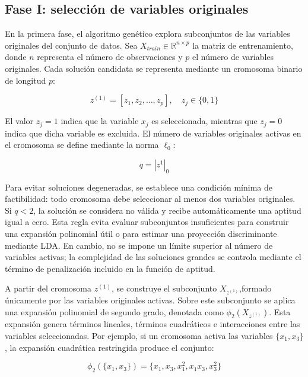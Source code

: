 \subsection{Fase I: selección de variables originales}


En la primera fase, el algoritmo genético explora subconjuntos de las variables originales del conjunto de datos. Sea $X_{train} \in \mathbb{R}^{n\times p}$ la matriz de entrenamiento, donde $n$ representa el número de observaciones y $p$ el número de variables originales. Cada solución candidata se representa mediante un cromosoma binario de longitud $p$:

\begin{equation}
	z^{(1)} = [z_1,z_2,\dots,z_p],  \quad z_j \in \{0,1\}
	\label{eq:EM1}
\end{equation}


El valor $z_j=1$ indica que la variable $x_j$ es seleccionada, mientras que $z_j=0$ indica que dicha variable es excluida. El número de variables originales activas en el cromosoma se define mediante la norma $\ell_0$:

\begin{equation}
	q = |z^{1}|_0
	\label{eq:EM2}
\end{equation}

Para evitar soluciones degeneradas, se establece una condición mínima de factibilidad: todo cromosoma debe seleccionar al menos dos variables originales. Si $q<2$, la solución se considera no válida y recibe automáticamente una aptitud igual a cero. Esta regla evita evaluar subconjuntos insuficientes para construir una expansión polinomial útil o para estimar una proyección discriminante mediante LDA. En cambio, no se impone un límite superior al número de variables activas; la complejidad de las soluciones grandes se controla mediante el término de penalización incluido en la función de aptitud.

A partir del cromosoma $z^{(1)}$, se construye el subconjunto $X_{z^{(1)}}$,formado únicamente por las variables originales activas. Sobre este subconjunto se aplica una expansión polinomial de segundo grado, denotada como $\phi_2(X_{z^{(1)}})$. Esta expansión genera términos lineales, términos cuadráticos e interacciones entre las variables seleccionadas. Por ejemplo, si un cromosoma activa las variables $\{x_1,x_3\}$, la expansión cuadrática restringida produce el conjunto:

\begin{equation}
	\phi_2(\{x_1,x_3\}) = \{x_1,x_3,x_1^2,x_1x_3,x_3^2\}
	\label{eq:EM3}
\end{equation}

